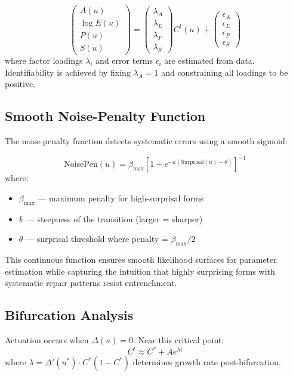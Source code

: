 \documentclass[12pt]{article}
\begin{document}
\[
\begin{pmatrix}
A(u) \\
\log E(u) \\
P(u) \\
S(u)
\end{pmatrix}
=
\begin{pmatrix}
\lambda_A \\
\lambda_E \\
\lambda_P \\
\lambda_S
\end{pmatrix}
C^t(u) +
\begin{pmatrix}
\epsilon_A \\
\epsilon_E \\
\epsilon_P \\
\epsilon_S
\end{pmatrix}
\]
where factor loadings $\lambda_i$ and error terms $\epsilon_i$ are estimated from data. Identifiability is achieved by fixing $\lambda_A = 1$ and constraining all loadings to be positive.

\subsection{Smooth Noise-Penalty Function} \label{sec:noise-penalty}

The noise-penalty function detects systematic errors using a smooth sigmoid:

\[
\text{NoisePen}(u) = \beta_{\text{max}}\left[1 + e^{-k(\text{Surprisal}(u) - \theta)}\right]^{-1}
\]
where:
\begin{itemize}
\item $\beta_{\text{max}}$ — maximum penalty for high-surprisal forms
\item $k$ — steepness of the transition (larger = sharper)
\item $\theta$ — surprisal threshold where penalty = $\beta_{\text{max}}/2$
\end{itemize}
This continuous function ensures smooth likelihood surfaces for parameter estimation while capturing the intuition that highly surprising forms with systematic repair patterns resist entrenchment.

\subsection{Bifurcation Analysis}

Actuation occurs when $\Delta(u) = 0$. Near this critical point:
\[
C^t \approx C^* + A e^{\lambda t}
\]
where $\lambda = \Delta'(u^*) \cdot C^*(1-C^*)$ determines growth rate post-bifurcation.
\end{document}
